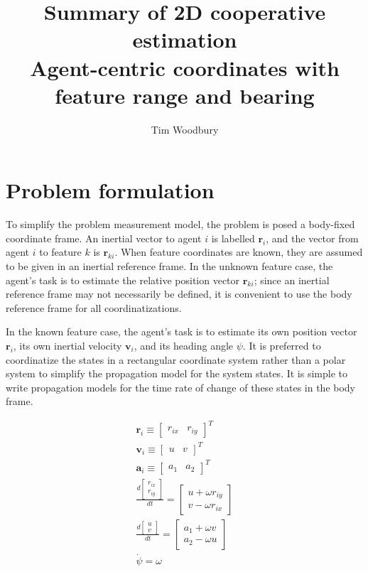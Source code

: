\documentclass{aiaa-tc}
\title{Summary of 2D cooperative estimation \\ \large{Agent-centric coordinates with feature range and bearing}}
\author{Tim Woodbury}
\newcommand{\B}[1]{\textbf{#1}} %
\newcommand{\ddt}[1]{\frac{d#1}{dt}} %
\begin{document}
\maketitle

\section{Problem formulation}

To simplify the problem measurement model, the problem is posed a body-fixed coordinate frame. An inertial vector to agent $i$ is labelled $\B{r}_i$, and the vector from agent $i$ to feature $k$ is $\B{r}_{ki}$. When feature coordinates are known, they are assumed to be given in an inertial reference frame. In the unknown feature case, the agent's task is to estimate the relative position vector $\B{r}_{ki}$; since an inertial reference frame may not necessarily be defined, it is convenient to use the body reference frame for all coordinatizations.

In the known feature case, the agent's task is to estimate its own position vector $\B{r}_i$, its own inertial velocity $\B{v}_i$, and its heading angle $\psi$. It is preferred to coordinatize the states in a rectangular coordinate system rather than a polar system to simplify the propagation model for the system states. It is simple to write propagation models for the time rate of change of these states in the body frame.

\begin{align}
\B{r}_i \equiv \begin{bmatrix}
r_{ix} &
r_{iy}
\end{bmatrix}^T\\
\B{v}_i \equiv \begin{bmatrix} 
u & v
\end{bmatrix}^T\\
\B{a}_i \equiv \begin{bmatrix}
a_1 & a_2
\end{bmatrix}^T\\
\ddt{\begin{bmatrix} r_{ix} \\ r_{iy}
\end{bmatrix}} = \begin{bmatrix}
u + \omega r_{iy} \\
v - \omega r_{ix}
\end{bmatrix} \\
\ddt{\begin{bmatrix} u \\ v
\end{bmatrix}} = \begin{bmatrix}
a_1 + \omega v \\
a_2 - \omega u
\end{bmatrix} \\
\dot{\psi} = \omega
\end{align}
\end{document}
